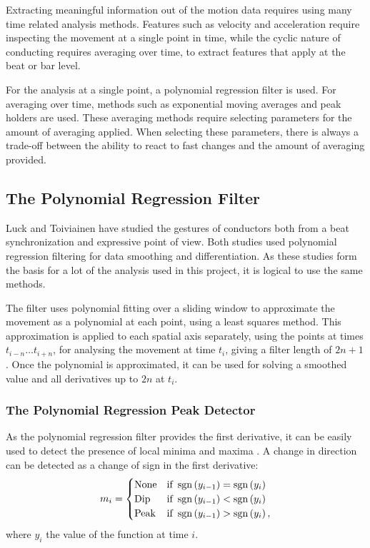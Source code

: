 Extracting meaningful information out of the motion data
requires using many time related analysis methods.
Features such as velocity and acceleration
require inspecting the movement at a single point in time,
while the cyclic nature of conducting requires
averaging over time, to extract features that apply
at the beat or bar level.

For the analysis at a single point,
a polynomial regression filter is used.
For averaging over time, methods such as
exponential moving averages and peak holders are used.
These averaging methods require selecting 
parameters for the amount of averaging applied.
When selecting these parameters,
there is always a trade-off between the 
ability to react to fast changes
and the amount of averaging provided.

\subsection{The Polynomial Regression Filter}

Luck and Toiviainen have studied the gestures of conductors
both from a beat synchronization \cite{luck2006}
and expressive \cite{luck2010} point of view.
Both studies used polynomial regression filtering
for data smoothing and differentiation.
As these studies form the basis for a lot
of the analysis used in this project,
it is logical to use the same methods.

The filter uses polynomial fitting
over a sliding window to approximate the movement
as a polynomial at each point,
using a least squares method.
This approximation is applied to each spatial axis separately,
using the points at times $t_{i-n} \ldots t_{i+n}$,
for analysing the movement at time $t_i$,
giving a filter length of $2n + 1$.
Once the polynomial is approximated,
it can be used for solving a smoothed value and
all derivatives up to $2n$ at $t_i$.

\subsubsection*{The Polynomial Regression Peak Detector}

As the polynomial regression filter provides the first derivative,
it can be easily used to detect the presence of local minima and maxima
.
A change in direction can be detected as a change of sign in the first derivative:
\begin{equation}
m_i =
\begin{cases}
\mathrm{None} & \text{if } \operatorname{sgn} \left( y_{i-1} \right) = \operatorname{sgn} \left( y_{i} \right) \\
\mathrm{Dip} & \text{if } \operatorname{sgn} \left( y_{i-1} \right) < \operatorname{sgn} \left( y_{i} \right) \\
\mathrm{Peak} & \text{if } \operatorname{sgn} \left( y_{i-1} \right) > \operatorname{sgn} \left( y_{i} \right) ,
\end{cases}
\end{equation}
where $y_i$ the value of the function at time $i$.

